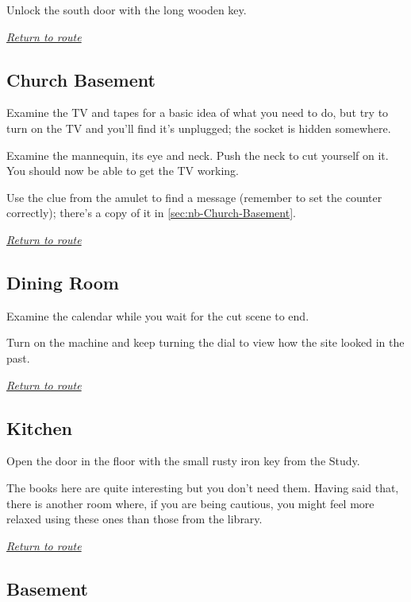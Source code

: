 \documentclass[a5paper]{extarticle}
\begin{document}
Unlock the south door with the long wooden key.

\hyperref[sec:route-7]{\emph{Return to route}}

\newpage
\subsection{Church Basement}\label{sec:sol-Church-Basement}

Examine the TV and tapes for a basic idea of what you need to do,
but try to turn on the TV and you'll find it's unplugged;
the socket is hidden somewhere.

Examine the mannequin, its eye and neck. Push the neck to cut yourself on it.
You should now be able to get the TV working.

Use the clue from the amulet to find a message (remember to set the counter correctly);
there's a copy of it in \cref{sec:nb-Church-Basement}.

\hyperref[sec:route-7]{\emph{Return to route}}

\newpage
\subsection{Dining Room}\label{sec:sol-Dining-Room}

Examine the calendar while you wait for the cut scene to end.

Turn on the machine and keep turning the dial to view how the site looked in the past.

\hyperref[sec:route-8]{\emph{Return to route}}

\newpage
\subsection{Kitchen}\label{sec:sol-Kitchen}

Open the door in the floor with the small rusty iron key from the Study.

The books here are quite interesting but you don't need them.
Having said that, there is another room where, if you are being cautious,
you might feel more relaxed using these ones than those from the library.

\hyperref[sec:route-8]{\emph{Return to route}}

\newpage
\subsection{Basement}\label{sec:sol-Basement}
\end{document}
